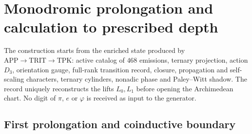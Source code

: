 \section{Monodromic prolongation and calculation to prescribed depth}
\label{sec:generacion-monodromica-certificada-rev7}

The construction starts from the enriched state produced by
\(\mathrm{APP}\to\mathrm{TRIT}\to\mathrm{TPK}\): active catalog of
\(468\) emissions, ternary projection, action \(D_3\), orientation
gauge, full-rank transition record, closure,
propagation and self-scaling characters, ternary cylinders, nonadic phase and
Paley--Witt shadow. The record uniquely reconstructs the
lifts \(L_0,L_1\) before opening the Archimedean chart. No
digit of \(\pi\), \(e\) or \(\varphi\) is received as input to the generator.

\subsection{First prolongation and coinductive boundary}

